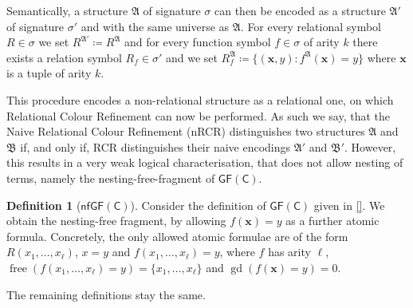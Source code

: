 \documentclass[a4paper,11pt,DIV=15]{scrartcl} %
\theoremstyle{plain}
\theoremstyle{definition}
\newtheorem{definition}[theorem]{Definition}
\newcommand{\GFC}{\mathsf{GF}(\mathsf{C})}
\newcommand{\free}[1]{\operatorname{free}(#1)}
\newcommand{\gd}[1]{\operatorname{gd}(#1)}
\begin{document}
Semantically, a structure $\mathfrak A$ of signature $\sigma$ can then be encoded as a structure $\mathfrak A'$ of signature $\sigma'$ and with the same universe as $\mathfrak A$. 
For every relational symbol $R\in\sigma$ we set $R^{\mathfrak A'}\coloneqq R^{\mathfrak A}$ and for every function symbol $f\in\sigma$ of arity $k$ there exists a relation symbol $R_f\in\sigma'$ and we set $R_f^{\mathfrak A}\coloneqq \{(\mathbf x, y) : f^{\mathfrak A}(\mathbf x)=y\}$ where $\mathbf x$ is a tuple of arity $k$.

This procedure encodes a non-relational structure as a relational one, on which Relational Colour Refinement can now be performed.
As such we say, that the Naive Relational Colour Refinement (nRCR) distinguishes two structures $\mathfrak A$ and $\mathfrak B$ if, and only if, RCR distinguishes their naive encodings $\mathfrak A'$ and $\mathfrak B'$.
However, this results in a very weak logical characterisation, that does not allow nesting of terms, namely the nesting-free-fragment of $\GFC$.

\begin{definition}[$\mathsf{nfGF}(\mathsf C)$]
	Consider the definition of $\GFC$ given in \ref{}.
	We obtain the nesting-free fragment, by allowing $f(\mathbf x)=y$ as a further atomic formula.
	Concretely, the only allowed atomic formulae are of the form $R(x_1,\dots,x_\ell)$, $x=y$ and $f(x_1,\dots,x_\ell)=y$, where $f$ has arity $\ell$, $\free{f(x_1,\dots,x_\ell)=y}=\{x_1,\dots,x_\ell\}$ and $\gd{f(\mathbf x)=y}=0$.
	
	The remaining definitions stay the same.
\end{definition}
\end{document}
